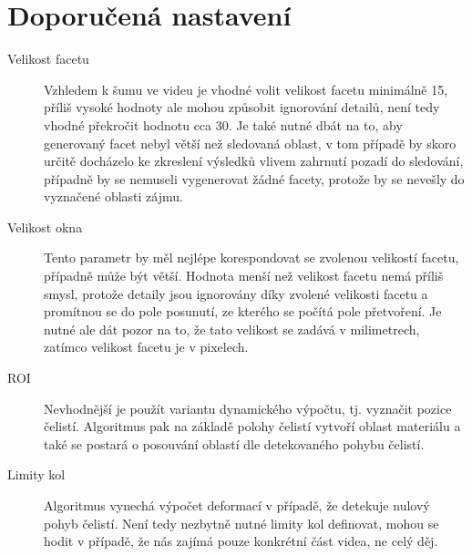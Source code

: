 \documentclass[a4paper,12pt]{article}
\begin{document}
\section{Doporučená nastavení}
\label{sec:goodSettings}
\begin{description}
\item[Velikost facetu] Vzhledem k šumu ve videu je vhodné volit velikost facetu minimálně 15, příliš vysoké hodnoty ale mohou způsobit ignorování detailů, není tedy vhodné překročit hodnotu cca 30. Je také nutné dbát na to, aby generovaný facet nebyl větší než sledovaná oblast, v tom případě by skoro určitě docházelo ke zkreslení výsledků vlivem zahrnutí pozadí do sledování, případně by se nemuseli vygenerovat žádné facety, protože by se nevešly do vyznačené oblasti zájmu.
\item[Velikost okna] Tento parametr by měl nejlépe korespondovat se zvolenou velikostí facetu, případně může být větší. Hodnota menší než velikost facetu nemá příliš smysl, protože detaily jsou ignorovány díky zvolené velikosti facetu a promítnou se do pole posunutí, ze kterého se počítá pole přetvoření. Je nutné ale dát pozor na to, že tato velikost se zadává v milimetrech, zatímco velikost facetu je v pixelech.
\item[ROI] Nevhodnější je použít variantu dynamického výpočtu, tj. vyznačit pozice čelistí. Algoritmus pak na základě polohy čelistí vytvoří oblast materiálu a také se postará o posouvání oblastí dle detekovaného pohybu čelistí. 
\item[Limity kol] Algoritmus vynechá výpočet deformací v případě, že detekuje nulový pohyb čelistí. Není tedy nezbytně nutné limity kol definovat, mohou se hodit v případě, že nás zajímá pouze konkrétní část videa, ne celý děj.
\end{description}
\newpage
\end{document}
